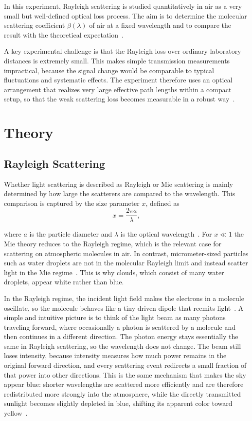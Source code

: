 \documentclass[a4paper]{article}
\begin{document}
In this experiment, Rayleigh scattering is studied quantitatively in air as a very small but well-defined optical loss process.
The aim is to determine the molecular scattering coefficient $\beta(\lambda)$ of air at a fixed wavelength and to compare the result with the theoretical expectation~\cite{RAYAnleitung}.

A key experimental challenge is that the Rayleigh loss over ordinary laboratory distances is extremely small.
This makes simple transmission measurements impractical, because the signal change would be comparable to typical fluctuations and systematic effects.
The experiment therefore uses an optical arrangement that realizes very large effective path lengths within a compact setup, so that the weak scattering loss becomes measurable in a robust way~\cite{RAYAnleitung}.

\section{Theory}

\subsection{Rayleigh Scattering}
\label{sec:theory_rayleigh}

Whether light scattering is described as Rayleigh or Mie scattering is mainly determined by how large the scatterers are compared to the wavelength.
This comparison is captured by the size parameter $x$, defined as
\[
x=\frac{2\pi a}{\lambda},
\]

where $a$ is the particle diameter and $\lambda$ is the optical wavelength~\cite{RAYAnleitung}.
For $x\ll 1$ the Mie theory reduces to the Rayleigh regime, which is the relevant case for scattering on atmospheric molecules in air.
In contrast, micrometer-sized particles such as water droplets are not in the molecular Rayleigh limit and instead scatter light in the Mie regime~\cite{RAYAnleitung}.
This is why clouds, which consist of many water droplets, appear white rather than blue.

In the Rayleigh regime, the incident light field makes the electrons in a molecule oscillate, so the molecule behaves like a tiny driven dipole that reemits light~\cite{RAYAnleitung, Miles2001}.
A simple and intuitive picture is to think of the light beam as many photons traveling forward, where occasionally a photon is scattered by a molecule and then continues in a different direction.
The photon energy stays essentially the same in Rayleigh scattering, so the wavelength does not change.
The beam still loses intensity, because intensity measures how much power remains in the original forward direction, and every scattering event redirects a small fraction of that power into other directions.
This is the same mechanism that makes the sky appear blue: shorter wavelengths are scattered more efficiently and are therefore redistributed more strongly into the atmosphere, while the directly transmitted sunlight becomes slightly depleted in blue, shifting its apparent color toward yellow~\cite{RAYAnleitung}.
\end{document}
